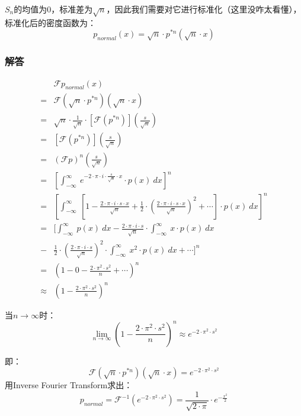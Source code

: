 $S_n$的均值为$0$，标准差为$\sqrt{n}$，因此我们需要对它进行标准化（这里没咋太看懂），标准化后的密度函数为：
$$
	p_{normal}(x)=\sqrt{n}\cdot p^{*n}(\sqrt{n}\cdot x)
$$
\subsubsection{解答}
\begin{align*}
	        & \mathcal{F}p_{normal}(x)                                                                                                                                                     \\
	=       & \mathcal{F}(\sqrt{n}\cdot p^{*n})(\sqrt{n}\cdot x)                                                                                                                           \\
	=       & \sqrt{n}\cdot\frac{1}{\sqrt{n}}\cdot [\mathcal{F}(p^{*n})](\frac{s}{\sqrt{n}})                                                                                               \\
	=       & [\mathcal{F}(p^{*n})](\frac{s}{\sqrt{n}})                                                                                                                                    \\
	=       & (\mathcal{F}p)^n(\frac{s}{\sqrt{n}})                                                                                                                                         \\
	=       & [\int_{-\infty}^{\infty}\ e^{-2\cdot \pi\cdot i\cdot \frac{s}{\sqrt{n}}\cdot x}\cdot p(x)\ dx]^n                                                                             \\
	=       & [\int_{-\infty}^{\infty}\ [1-\frac{2\cdot \pi\cdot i\cdot s\cdot x}{\sqrt{n}}+\frac{1}{2}\cdot (\frac{2\cdot \pi\cdot i\cdot s\cdot x}{\sqrt{n}})^2+\cdots]\cdot p(x)\ dx]^n \\
	=       & [\int_{-\infty}^{\infty}\ p(x)\ dx-\frac{2\cdot \pi\cdot i\cdot s}{\sqrt{n}}\cdot \int_{-\infty}^{\infty}\ x\cdot p(x)\ dx                                                   \\
	-       & \frac{1}{2}\cdot (\frac{2\cdot \pi\cdot i\cdot s}{\sqrt{n}})^2\cdot \int_{-\infty}^{\infty}\ x^2\cdot p(x)\ dx+\cdots]^n                                                     \\
	=       & (1-0-\frac{2\cdot\pi^2\cdot s^2}{n}+\cdots)^n                                                                                                                                \\
	\approx & (1-\frac{2\cdot \pi^2\cdot s^2}{n})^n
\end{align*}

当$n\rightarrow\infty$时：
$$
	\lim\limits_{n\rightarrow\infty}(1-\frac{2\cdot \pi^2\cdot s^2}{n})^n\approx e^{-2\cdot\pi^2\cdot s^2}
$$

即：
$$
	\mathcal{F}(\sqrt{n}\cdot p^{*n})(\sqrt{n}\cdot x)=e^{-2\cdot\pi^2\cdot s^2}
$$
用Inverse Fourier Transform求出：
\begin{equation}
	p_{normal}=\mathcal{F}^{-1}(e^{-2\cdot\pi^2\cdot s^2})=\frac{1}{\sqrt{2\cdot \pi}}\cdot e^{-\frac{x^2}{2}}
\end{equation}